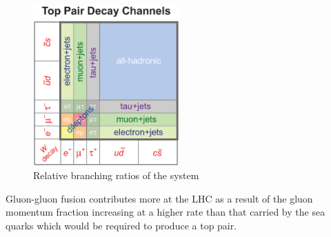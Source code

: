 \begin{figure}[hbtp]
   \centering
     \includegraphics[width=0.5\textwidth]{Chapters/02_Theory/Images/top_pair_decay_channels.eps}\hfill
     \caption{Relative branching ratios of the \ttbar system}
     \label{fig:ttbar_branching_ratios}
\end{figure}

Gluon-gluon fusion contributes more at the LHC as a result of the gluon momentum fraction increasing at a
higher rate than that carried by the sea quarks which would be required to produce a top pair.